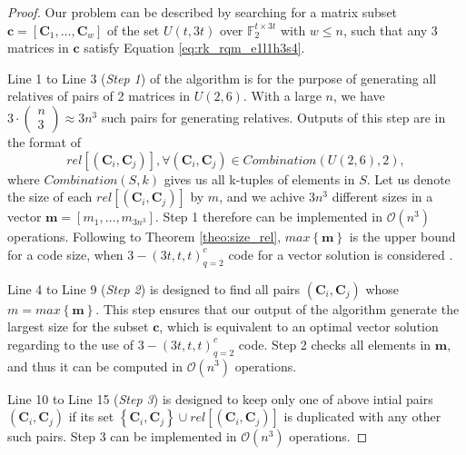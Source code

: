 \begin{proof}
Our problem can be described by searching for a matrix subset $\boldsymbol{c}=\left[\boldsymbol{C}_{1},\ldots,\boldsymbol{C}_{w}\right]$
of the set $U(t,3t)$ over $\ensuremath{\mathbb{F}}_{2}^{t\times3t}$
with $w\leq n$, such that any 3 matrices in $\boldsymbol{c}$ satisfy
Equation \ref{eq:rk_rqm_e1l1h3s4}. 

Line 1 to Line 3 (\textit{Step 1}) of the algorithm is for the purpose
of generating all relatives of pairs of 2 matrices in $U(2,6)$. With
a large $n$, we have $3\cdot\left(\begin{array}{c}
n\\
3
\end{array}\right)\approx3n^{3}$ such pairs for generating relatives. Outputs of this step are in
the format of 
\[
rel\left[\left(\boldsymbol{C}_{i},\boldsymbol{C}_{j}\right)\right],\forall\left(\boldsymbol{C}_{i},\boldsymbol{C}_{j}\right)\in Combination\left(U(2,6),2\right),
\]
where $Combination(S,k)$ gives us all k-tuples of elements in $S$.
Let us denote the size of each $rel\left[\left(\boldsymbol{C}_{i},\boldsymbol{C}_{j}\right)\right]$
by $m$, and we achive $3n^{3}$ different sizes in a vector $\boldsymbol{m}=\left[m_{1},\ldots,m_{3n^{3}}\right].$
Step 1 therefore can be implemented in $\mathcal{O}\left(n^{3}\right)$
operations. Following to Theorem \ref{theo:size_rel}, $max\left\{ \boldsymbol{m}\right\} $
is the upper bound for a code size, when $3-\left(3t,t,t\right)_{q=2}^{c}$
code for a vector solution is considered \cite[Sec. V-D]{Zhang:2019}.

Line 4 to Line 9 (\textit{Step 2}) is designed to find all pairs $\left(\boldsymbol{C}_{i},\boldsymbol{C}_{j}\right)$
whose $m=max\left\{ \boldsymbol{m}\right\} $. This step ensures that
our output of the algorithm generate the largest size for the subset
$\boldsymbol{c}$, which is equivalent to an optimal vector solution
regarding to the use of $3-\left(3t,t,t\right)_{q=2}^{c}$ code. Step
2 checks all elements in $\boldsymbol{m}$, and thus it can be computed
in $\mathcal{O}\left(n^{3}\right)$ operations.

Line 10 to Line 15 (\textit{Step 3}) is designed to keep only one
of above intial pairs $\left(\boldsymbol{C}_{i},\boldsymbol{C}_{j}\right)$
if its set $\left\{ \boldsymbol{C}_{i},\boldsymbol{C}_{j}\right\} \cup rel\left[\left(\boldsymbol{C}_{i},\boldsymbol{C}_{j}\right)\right]$
is duplicated with any other such pairs. Step 3 can be implemented
in $\mathcal{O}\left(n^{3}\right)$ operations.


\end{proof}
